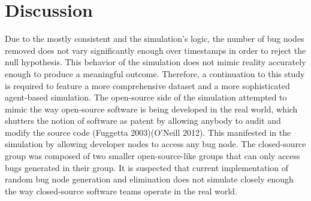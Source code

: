 \documentclass[10pt, a4paper, fleqn]{article}
\begin{document}
\section{Discussion}
Due to the mostly consistent and the simulation's logic, the number of bug nodes removed does not vary significantly enough over timestamps in order to reject the null hypothesis. This behavior of the simulation does not mimic reality accurately enough to produce a meaningful outcome. Therefore, a continuation to this study is required to feature a more comprehensive dataset and a more sophisticated agent-based simulation.
\bigbreak
The open-source side of the simulation attempted to mimic the way open-source software is being developed in the real world, which shutters the notion of software as patent by allowing anybody to audit and modify the source code (Fuggetta 2003)(O’Neill 2012). This manifested in the simulation by allowing developer nodes to access any bug node. The closed-source group was composed of two smaller open-source-like groups that can only access bugs generated in their group. It is suspected that current implementation of random bug node generation and elimination does not simulate closely enough the way closed-source software teams operate in the real world.
\end{document}

